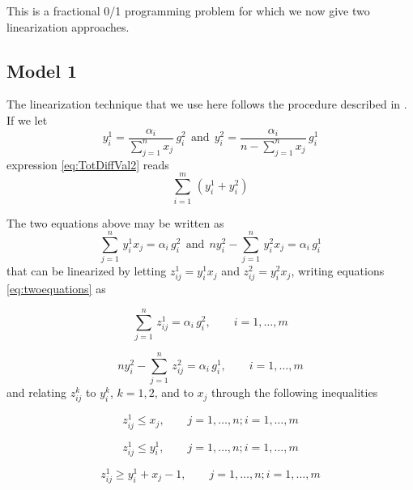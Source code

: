 This is a fractional 0/1 programming problem \citep{BGP2017} for which we now give two linearization approaches.

\subsection{Model 1}\label{Model1}

The linearization technique that we use here follows the procedure described in \citet{BGP2017}.
If we let
\[y_i^1= \frac{\alpha_{i}}{\sum_{j=1}^n x_j} \, g_i^2 ~~\mbox{and}~~y_i^2= \frac{\alpha_{i}}{n-\sum_{j=1}^n x_j} \, g_i^1\]
expression \eqref{eq:TotDiffVal2} reads
\begin{equation}
\sum_{i=1}^m \, (y_i^1+y_i^2)
\label{eq:y1plusy2}
\end{equation}

The two equations above may be written as
\begin{equation}
\sum_{j=1}^n\,   y_i^1 x_j = \alpha_{i} \, g_i^2 ~~\mbox{and}~~
n y_i^2 - \sum_{j=1}^n \, y_i^2 x_j = \alpha_{i} \, g_i^1
\label{eq:twoequations}
\end{equation}
that can be linearized by letting \(z_{ij}^1=y_i^1 x_j\) and \(z_{ij}^2=y_i^2 x_j\), writing equations \eqref{eq:twoequations} as

\begin{equation}
\sum_{j=1}^n\,   z_{ij}^1 = \alpha_{i} \, g_i^2, \quad \quad i=1,\dots, m   
\label{eq:z1equation}
\end{equation}

\begin{equation}
n y_i^2 - \sum_{j=1}^n\,   z_{ij}^2 = \alpha_{i} \, g_i^1, \quad \quad i=1,\dots, m 
\label{eq:z2equation}
\end{equation}
and relating \(z_{ij}^k\) to \(y_i^k\), \(k=1,2\), and to \(x_j\) through the following inequalities

\begin{equation}
z_{ij}^1 \leq x_j, \quad \quad j=1,\dots,n; i=1,\dots, m
\label{eq:z1unequality1}
\end{equation}

\begin{equation}
z_{ij}^1 \leq y_i^1, \quad \quad j=1,\dots,n; i=1,\dots, m
\label{eq:z1unequality2}
\end{equation}

\begin{equation}
z_{ij}^1 \geq y_i^1+x_j-1, \quad \quad j=1,\dots,n; i=1,\dots, m
\label{eq:z1unequality3}
\end{equation}

